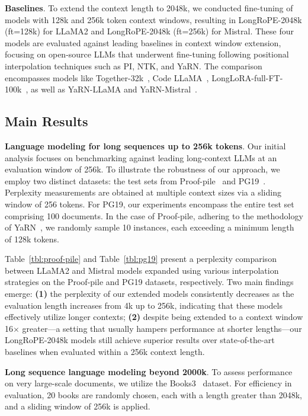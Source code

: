 \textbf{Baselines}. To extend the context length to 2048k, we conducted fine-tuning of models with 128k and 256k token context windows, resulting in LongRoPE-2048k (ft=128k) for LLaMA2 and LongRoPE-2048k (ft=256k) for Mistral. These four models are evaluated against leading baselines in context window extension, focusing on open-source LLMs that underwent fine-tuning following positional interpolation techniques such as PI, NTK, and YaRN. The comparison encompasses models like Together-32k~\cite{together}, Code LLaMA~\cite{codellama}, LongLoRA-full-FT-100k~\cite{longlora}, as well as YaRN-LLaMA and YaRN-Mistral~\cite{yarn}.

\subsection{Main Results}

\label{sec:mainresult}
\textbf{Language modeling for long sequences up to 256k tokens}. Our initial analysis focuses on benchmarking against leading long-context LLMs at an evaluation window of 256k. To illustrate the robustness of our approach, we employ two distinct datasets: the test sets from Proof-pile~\cite{pg19} and PG19~\cite{pile}. Perplexity measurements are obtained at multiple context sizes via a sliding window of 256 tokens. For PG19, our experiments encompass the entire test set comprising 100 documents. In the case of Proof-pile, adhering to the methodology of YaRN~\cite{yarn}, we randomly sample 10 instances, each exceeding a minimum length of 128k tokens.

Table~\ref{tbl:proof-pile} and Table~\ref{tbl:pg19} present a perplexity comparison between LLaMA2 and Mistral models expanded using various interpolation strategies on the Proof-pile and PG19 datasets, respectively. Two main findings emerge: \textbf{(1)} the perplexity of our extended models consistently decreases as the evaluation length increases from 4k up to 256k, indicating that these models effectively utilize longer contexts; \textbf{(2)} despite being extended to a context window 16$\times$ greater—a setting that usually hampers performance at shorter lengths—our LongRoPE-2048k models still achieve superior results over state-of-the-art baselines when evaluated within a 256k context length.

\textbf{Long sequence language modeling beyond 2000k}. To assess performance on very large-scale documents, we utilize the Books3~\cite{pile} dataset. For efficiency in evaluation, 20 books are randomly chosen, each with a length greater than 2048k, and a sliding window of 256k is applied.

